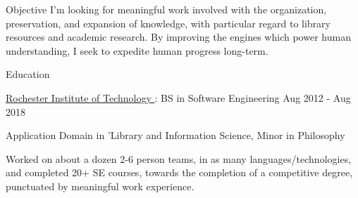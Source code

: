 \documentclass{resume} %
\begin{document}
  \begin{rSection}{Objective}
    I'm looking for meaningful work involved with the organization, preservation, and expansion of knowledge, with particular regard to library resources and academic research. By improving the engines which power human understanding, I seek to expedite human progress long-term.
  \end{rSection}

  \begin{rSection}{Education}

    \begin{rSubsection}{\underline{Rochester Institute of Technology }: BS in Software Engineering }{ Aug 2012 - Aug 2018 }{}

      \item Application Domain in 'Library and Information Science, Minor in Philosophy

      \item Worked on about a dozen 2-6 person teams, in as many languages/technologies, and completed 20+ SE courses, towards the completion of a competitive degree, punctuated by meaningful work experience.

    \end{rSubsection}

  \end{rSection}
\end{document}
